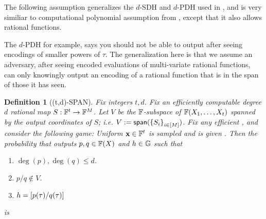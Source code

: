 \documentclass[11pt]{article}
\numberwithin{figure}{section} %
\newtheorem{dfn}[thm]{Definition}
\newcommand{\x}{\ensuremath{\mathbf{x}}\xspace}
\renewcommand{\span}{\ensuremath{\mathsf{span}}\xspace}
\begin{document}
The following assumption generalizes the $d$-SDH and $d$-PDH used in \cite{GGPR, PHGR}, and is very similiar to computational polynomial assumption from \cite{GM17},
except that it also allows rational functions.

The $d$-PDH for example, says you should not be able to output  after seeing encodings of smaller powers of $\tau$. The generalization here is that we assume an adversary, after seeing encoded evaluations of multi-variate rational functions, can only knowingly output an encoding of a rational function that is in the span of those it has seen.
\begin{dfn}[(t,d)-SPAN]\label{dfn:spanassump}
 Fix integers $t,d$.
Fix an efficiently computable degree $d$ rational map $S:\mathbb F^{t}\to\mathbb F^M$.
Let $V$ be the $\mathbb F$-subspace of $\mathbb F(X_1,\ldots,X_t)$
spanned by the output coordinates of $S$; i.e.
$V\defeq \span(\sett{S_i}{i\in[M]})$.
Fix any efficient \adv, and consider the following game:
 Uniform $\x \in \F^t$ is sampled and  \adv is given \enc{S(\x)}. Then the probability that \adv 
 outputs  $p,q\in \mathbb F(X)$ and $h\in {\mathbb G}$ such that
 \begin{enumerate}
  \item $\deg(p),\deg(q)\leq d$.
  \item $p/q \notin V$.
  \item $h= \left[p(\tau)/q(\tau)\right]$
 \end{enumerate}
is \negl
\end{dfn}
\end{document}
